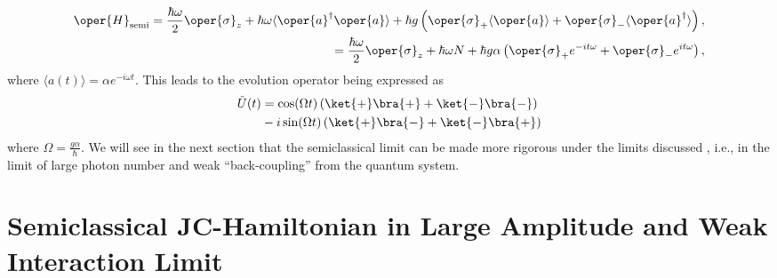 \begin{equation}
    \label{eq:chap5_JCM_Hamiltonian_semi}
    \begin{aligned}
        \oper{H}_{\text{semi}} = \frac{\hbar\omega}{2} \oper{\sigma}_z + \hbar \omega \langle \oper{a}^\dagger \oper{a} \rangle
    + \hbar g \left( \oper{\sigma}_+ \langle \oper{a} \rangle + \oper{\sigma}_- \langle \oper{a}^\dagger \rangle \right),\\
    = \frac{\hbar\omega}{2} \oper{\sigma}_z + \hbar \omega N 
    + \hbar g \alpha\left( \oper{\sigma}_+ e^{-it\omega} + \oper{\sigma}_- e^{it\omega} \right),
    \end{aligned}
\end{equation}
where \(\langle a(t) \rangle = \alpha e^{-i\omega t}\). This leads to the evolution operator being expressed as
\begin{align}
        \tilde{U}(t) &= 
                \cos(\Omega t) \left(\ket{+}\bra{+} + 
                \ket{-}\bra{-} \right)  \nonumber\\
                &- i \sin(\Omega t)
                 \left( \ket{+}\bra{-}
                +\ket{-}\bra{+}\right)
\end{align}
where \(\Omega = \frac{g\alpha}{\hbar}\). We will see in the next section that the semiclassical limit can be made more rigorous
under the limits discussed , i.e., in the limit of 
large photon number and weak ``back-coupling'' from the quantum system.

\section{Semiclassical JC-Hamiltonian  in Large Amplitude and Weak Interaction Limit\label{sec:chap5_large_amplitude_weak_g}}

